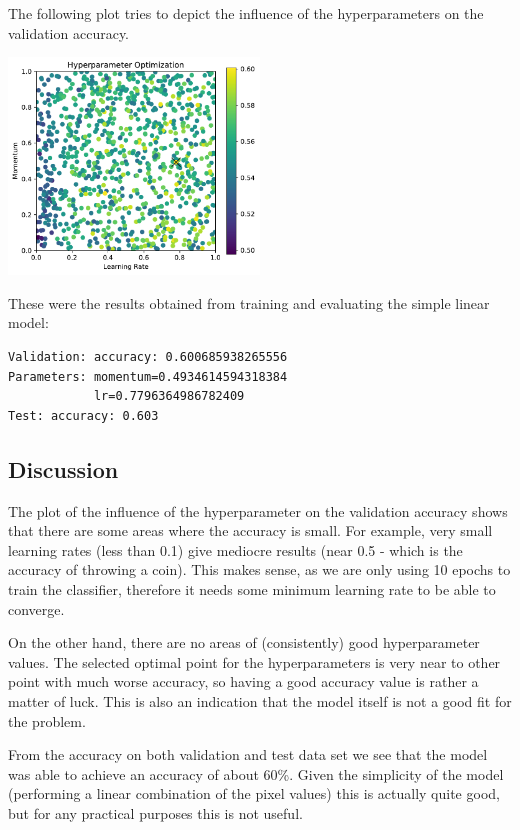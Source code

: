 \documentclass[sigconf,nonacm]{acmart}
\begin{document}
The following plot tries to depict the influence of the hyperparameters
on the validation
accuracy.

\includegraphics[width=0.5\textwidth]{plot.pdf}

These were the results obtained from training and evaluating
the simple linear model:
\begin{lstlisting}[basicstyle=\ttfamily\small]
Validation: accuracy: 0.600685938265556
Parameters: momentum=0.4934614594318384
            lr=0.7796364986782409
Test: accuracy: 0.603
\end{lstlisting}

\subsection{Discussion}

The plot of the influence of the hyperparameter on the validation accuracy
shows that there are some areas where the accuracy is small.
For example, very small learning rates (less than 0.1) give mediocre results
(near 0.5 - which is the accuracy of throwing a coin).
This makes sense, as we are only using 10 epochs to train the classifier,
therefore it needs some minimum learning rate to be able to converge.

On the other hand, there are no areas of (consistently) good hyperparameter values.
The selected optimal point for the hyperparameters is very near to other
point with much worse accuracy, so having a good accuracy value is rather a matter of luck.
This is also an indication that the model itself is not a good fit for the problem.

From the accuracy on both validation and test data set we see that the model
was able to achieve an accuracy of about 60\%.
Given the simplicity of the model (performing a linear combination of the pixel
values) this is actually quite good, but for any practical purposes this is
not useful.



\end{document}
